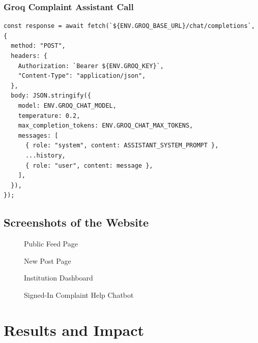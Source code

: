 \documentclass[12pt,a4paper]{report}
\begin{document}
\subsection*{Groq Complaint Assistant Call}
\begin{lstlisting}[caption={Complaint help assistant request to Groq}]
const response = await fetch(`${ENV.GROQ_BASE_URL}/chat/completions`, {
  method: "POST",
  headers: {
    Authorization: `Bearer ${ENV.GROQ_KEY}`,
    "Content-Type": "application/json",
  },
  body: JSON.stringify({
    model: ENV.GROQ_CHAT_MODEL,
    temperature: 0.2,
    max_completion_tokens: ENV.GROQ_CHAT_MAX_TOKENS,
    messages: [
      { role: "system", content: ASSISTANT_SYSTEM_PROMPT },
      ...history,
      { role: "user", content: message },
    ],
  }),
});
\end{lstlisting}

\section{Screenshots of the Website}
\begin{figure}[H]
\centering
{}
\caption{Public Feed Page}
\end{figure}

\begin{figure}[H]
\centering
{}
\caption{New Post Page}
\end{figure}

\begin{figure}[H]
\centering
{}
\caption{Institution Dashboard}
\end{figure}

\begin{figure}[H]
\centering
{}
\caption{Signed-In Complaint Help Chatbot}
\end{figure}

\chapter{Results and Impact}
\end{document}
